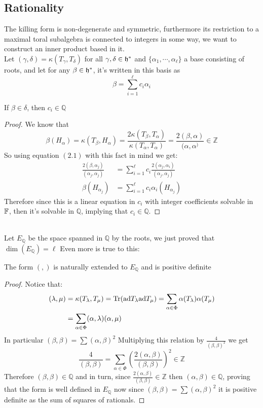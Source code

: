 \subsection*{Rationality}
The killing form is non-degenerate and symmetric, furthermore its restriction to a maximal toral subalgebra is connected to integers in some way, we want to construct an inner product based in it.\\
Let $(\gamma,\delta) = \kappa(T_\gamma,T_\delta)$ for all $\gamma,\delta \in \mathfrak{h}^*$ and $\{\alpha_1,\cdots,\alpha_\ell\}$ a base consisting of roots, and let for any $\beta \in \mathfrak{h}^*$, it's written in this basis as
\begin{equation}
 \beta = \sum_{i=1}^\ell c_i\alpha_i
\end{equation}
\begin{prop}
If $\beta \in \delta$, then $c_i \in \mathbb{Q}$
\end{prop}
\begin{proof}
We know that $$\beta(H_\alpha) = \kappa(T_\beta,H_\alpha) = \frac{2\kappa(T_\beta,T_\alpha)}{\kappa(T_\alpha,T_\alpha)} = \frac{2(\beta,\alpha)}{(\alpha,\alpha^)} \in \mathbb{Z}$$
So using equation $(2.1)$ with this fact in mind we get:
\begin{align}
	\frac{2(\beta,\alpha_j)}{(\alpha_j,\alpha_j)} &= \sum_{i=1}^\ell c_i \frac{2(\alpha_j,\alpha_i)}{(\alpha_j,\alpha_j)}\\
	\beta(H_{\alpha_j}) &= \sum_{i=1}^\ell c_i\alpha_i(H_{\alpha_j})
\end{align}
Therefore since this is a linear equation in $c_i$ with integer coefficients solvable in $\mathbb{F}$, then it's solvable in $\mathbb{Q}$, implying that $c_i \in \mathbb{Q}$.
\end{proof}\\
Let $E_\mathbb{Q}$ be the space spanned in $\mathbb{Q}$ by the roots, we just proved that $\dim(E_\mathbb{Q}) = \ell$ 
Even more is true to this:
\begin{prop}
	The form $(,)$ is naturally extended to $E_\mathbb{Q}$ and is positive definite
\end{prop}
\begin{proof}
	Notice that:
	\begin{align*}
		(\lambda,\mu) &= \kappa(T_\lambda,T_\mu) = \text{Tr}(\text{ad} T_\lambda\text{ad} T_\mu) = \sum_{\alpha \in \Phi} \alpha(T_\lambda)\alpha(T_\mu)\\
		&=\sum_{\alpha \in \Phi}(\alpha,\lambda)(\alpha,\mu)
	\end{align*}
	In particular $(\beta,\beta) = \sum (\alpha,\beta)^2$ 
	Multiplying this relation by $\frac{4}{(\beta,\beta)^2}$ we get
	$$ \frac{4}{(\beta,\beta)}=\sum_{\alpha \in \Phi}\left(\frac{2(\alpha,\beta)}{(\beta,\beta)}\right)^2 \in \mathbb{Z}$$
	Therefore $(\beta,\beta) \in \mathbb{Q}$ and in turn, since $\frac{2(\alpha,\beta) }{(\beta,\beta)} \in \mathbb{Z}$ then $(\alpha,\beta) \in \mathbb{Q}$, proving that the form is well defined in $E_{\mathbb{Q}}$ now since $(\beta,\beta)=\sum (\alpha,\beta)^2$ it is positive definite as the sum of squares of rationals.
\end{proof}
